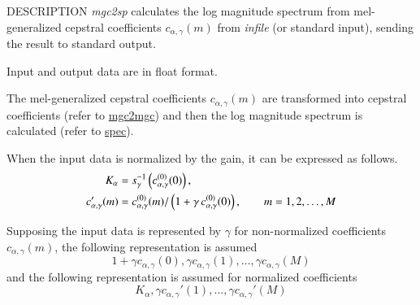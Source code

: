 \begin{synopsis}
\item[mgc2sp] [ --a $A$ ] [ --g $G$ ] [ --c $C$ ] [ --m $M$ ]
               [ --n ] [ --u ] [ --l $L$ ] [ --p ]
\item[\ ~~~~~] [ --o $O$ ] [ {\em infile} ]
\end{synopsis}

\begin{qsection}{DESCRIPTION}
{\em mgc2sp} calculates the log magnitude spectrum 
from mel-generalized cepstral coefficients $c_{\alpha, \gamma}(m)$
from {\em infile} (or standard input),
sending the result to standard output.

Input and output data are in float format.

The mel-generalized cepstral coefficients $c_{\alpha, \gamma}(m)$
are transformed into cepstral coefficients
(refer to \hyperlink{mgc2mgc}{mgc2mgc})
and then the log magnitude spectrum is calculated 
(refer to \hyperlink{spec}{spec}).

When the input data is normalized by the gain,
it can be expressed as follows.
\begin{align}
K_{\alpha} &= 
        s_{\gamma}^{-1}\left(c_{\alpha,\gamma}^{(0)}(0)\right), \notag \\
c_{\alpha,\gamma}'(m) &=
          c_{\alpha,\gamma}^{(0)}(m)/\left(1+\gamma\,
          c_{\alpha,\gamma}^{(0)}(0)\right), \qquad m = 1,2,\dots, M \notag
\end{align}

Supposing the input data is represented by $\gamma$
for non-normalized coefficients $c_{\alpha,\gamma}(m)$,
the following representation is assumed
\begin{displaymath}
1+\gamma c_{\alpha,\gamma}(0), \gamma c_{\alpha,\gamma}(1), \dots, \gamma c_{\alpha,\gamma}(M)
\end{displaymath}
and the following representation is assumed for normalized coefficients
\begin{displaymath}
K_\alpha,\gamma c_{\alpha,\gamma}'(1),\dots, \gamma c_{\alpha,\gamma}'(M)
\end{displaymath}

\end{qsection}

